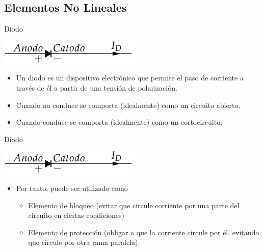 \documentclass[xcolor={usenames,svgnames,dvipsnames}]{beamer}
\begin{document}
\subsection{Elementos No Lineales}
\label{sec:orgafa730a}

\begin{frame}[label={sec:org8cf424f}]{Diodo}
\begin{center}
\includegraphics[height=0.15\textheight]{../figs/Diodo.pdf}
\end{center}

\begin{itemize}
\item Un diodo es un dispositivo electrónico que permite el paso de
corriente a través de él a partir de una tensión de polarización.

\item Cuando \alert{no conduce} se comporta (idealmente) como un \alert{circuito abierto}.

\item Cuando \alert{conduce} se comporta (idealmente) como un \alert{cortocircuito}.
\end{itemize}
\end{frame}

\begin{frame}[label={sec:orgfec8928}]{Diodo}
\begin{center}
\includegraphics[height=0.15\textheight]{../figs/Diodo.pdf}
\end{center}

\begin{itemize}
\item Por tanto, puede ser utilizado como

\begin{itemize}
\item \alert{Elemento de bloqueo} (evitar que circule corriente por una parte
del circuito en ciertas condiciones)

\item \alert{Elemento de protección} (obligar a que la corriente circule por
él, evitando que circule por otra rama paralela).
\end{itemize}
\end{itemize}
\end{frame}
\end{document}

